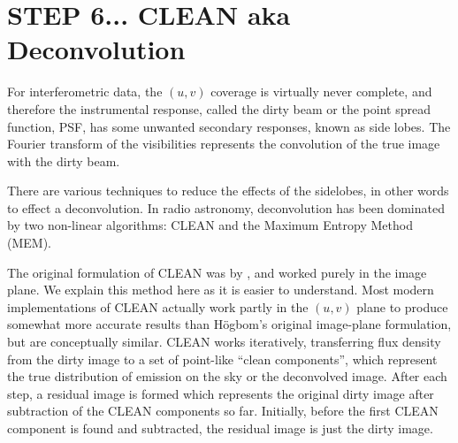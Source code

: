 \documentclass[force,almostfull,justified]{tufte-book}
\begin{document}
\section{STEP 6... CLEAN aka Deconvolution}

For interferometric data, the $(u,v)$ coverage is virtually never complete, and therefore the
instrumental response, called the dirty beam or the point spread function, PSF, has some unwanted
secondary responses, known as side lobes.  The Fourier transform of the visibilities represents the
convolution of the true image with the dirty beam.

There are various techniques to reduce the effects of the sidelobes, in other words to effect a
deconvolution.  In radio astronomy, deconvolution has been dominated by two non-linear algorithms:
CLEAN and the Maximum Entropy Method (MEM).

The original formulation of CLEAN was by \citet{Hogbom1974}, and worked purely in the image plane.  We
explain this method here as it is easier to understand.  Most modern implementations of CLEAN actually
work partly in the $(u,v)$ plane to produce somewhat more accurate results than H\"{o}gbom's original
image-plane formulation, but are conceptually similar.  CLEAN works iteratively, transferring flux
density from the dirty image to a set of point-like ``clean components'', which represent the true
distribution of emission on the sky or the deconvolved image.  After each step, a residual image is
formed which represents the original dirty image after subtraction of the CLEAN components so far.
Initially, before the first CLEAN component is found and subtracted, the residual image is just the
dirty image.
\end{document}
